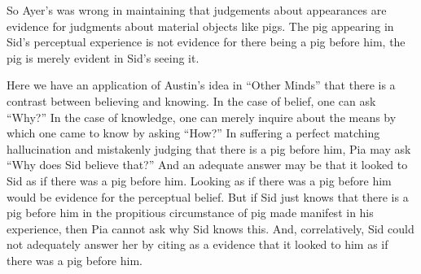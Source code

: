 So Ayer's was wrong in maintaining that judgements about appearances are evidence for judgments about material objects like pigs. The pig appearing in Sid's perceptual experience is not evidence for there being a pig before him, the pig is merely evident in Sid's seeing it. 

Here we have an application of Austin's \citeyearpar{Austin:1961kl} idea in ``Other Minds'' that there is a contrast between believing and knowing. In the case of belief, one can ask ``Why?'' In the case of knowledge, one can merely inquire about the means by which one came to know by asking ``How?'' In suffering a perfect matching hallucination and mistakenly judging that there is a pig before him, Pia may ask ``Why does Sid believe that?'' And an adequate answer may be that it looked to Sid as if there was a pig before him. Looking as if there was a pig before him would be evidence for the perceptual belief. But if Sid just knows that there is a pig before him in the propitious circumstance of pig made manifest in his experience, then Pia cannot ask why Sid knows this. And, correlatively, Sid could not adequately answer her by citing as a evidence that it looked to him as if there was a pig before him. 

